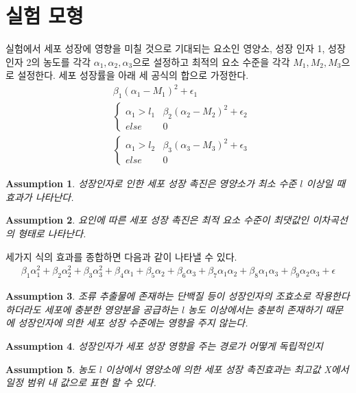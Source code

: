 \documentclass{article}
\newtheorem{assumption}{Assumption}
\begin{document}
    \section{실험 모형}
    실험에서 세포 성장에 영향을 미칠 것으로 기대되는 요소인 영양소, 성장 인자 1, 성장 인자 2의 농도를 각각 $\alpha_1,\alpha_2,\alpha_3$으로 설정하고 최적의 요소 수준을 각각 $M_1,M_2,M_3$으로 설정한다. 세포 성장률을 아래 세 공식의 합으로 가정한다.
    \begin{align}
        &\beta_1(\alpha_1-M_1)^2+\epsilon_1\\
        &\left\{\begin{matrix}
            \alpha_1>l_1 & \beta_2(\alpha_2-M_2)^2+\epsilon_2 \\
            else & 0
        \end{matrix}\right.\\
        &\left\{\begin{matrix}
            \alpha_1>l_2 & \beta_3(\alpha_3-M_3)^2+\epsilon_3 \\
            else & 0
        \end{matrix}\right.
    \end{align} 
    \begin{assumption}
        성장인자로 인한 세포 성장 촉진은 영양소가 최소 수준 $l$ 이상일 때 효과가 나타난다.
    \end{assumption}
    \begin{assumption}
        요인에 따른 세포 성장 촉진은 최적 요소 수준이 최댓값인 이차곡선의 형태로 나타난다.
    \end{assumption}
    세가지 식의 효과를 종합하면 다음과 같이 나타낼 수 있다. 
    \begin{align}
        \beta_1\alpha_1^2+\beta_2\alpha_2^2+\beta_3\alpha_3^2+\beta_4\alpha_1+\beta_5\alpha_2+\beta_6\alpha_3+\beta_7\alpha_1\alpha_2+\beta_8\alpha_1\alpha_3+\beta_9\alpha_2\alpha_3+\epsilon
    \end{align}
    \begin{assumption}
        조류 추출물에 존재하는 단백질 등이 성장인자의 조효소로 작용한다 하더라도 세포에 충분한 영양분을 공급하는 $l$ 농도 이상에서는 충분히 존재하기 때문에 성장인자에 의한 세포 성장 수준에는 영향을 주지 않는다. 
    \end{assumption}
    \begin{assumption}
        성장인자가 세포 성장 영향을 주는 경로가 어떻게 독립적인지 
    \end{assumption}
    \begin{assumption}
        농도 $l$ 이상에서 영양소에 의한 세포 성장 촉진효과는 최고값 X에서 일정 범위 내 값으로 표현 할 수 있다. 
    \end{assumption}
\end{document}

